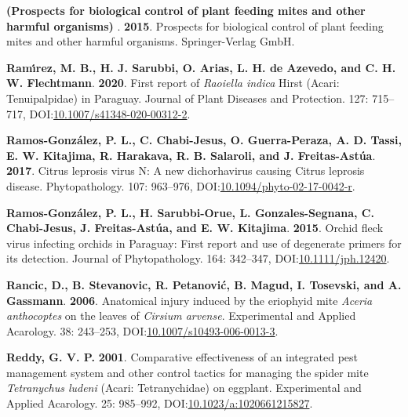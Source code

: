 \documentclass[12pt,final,CPage]{ufthesis}
\newlength{\cslhangindent}
\newenvironment{CSLReferences}[2] %
{%
	\setlength{\parindent}{0pt}
	\ifodd #1 \everypar{\setlength{\hangindent}{\cslhangindent}}\ignorespaces\fi
	\ifnum #2 > 0
	\setlength{\parskip}{#2\baselineskip}
	\fi
}%
{}
\begin{document}
{\begin{CSLReferences}{1}{0}
  \leavevmode{}%
  \textbf{(Prospects for biological control of plant feeding mites and other harmful organisms) }. \textbf{2015}. Prospects for biological control of plant feeding mites and other harmful organisms. Springer-Verlag GmbH.

  \leavevmode{}%
  \textbf{Ramı́rez, M. B., H. J. Sarubbi, O. Arias, L. H. de Azevedo, and C. H. W. Flechtmann}. \textbf{2020}. First report of {\emph{Raoiella indica}} {Hirst} ({Acari}: {Tenuipalpidae}) in {Paraguay}. Journal of Plant Diseases and Protection. 127: 715--717, DOI:\href{https://doi.org/10.1007/s41348-020-00312-2}{10.1007/s41348-020-00312-2}.

  \leavevmode{}%
  \textbf{Ramos-González, P. L., C. Chabi-Jesus, O. Guerra-Peraza, A. D. Tassi, E. W. Kitajima, R. Harakava, R. B. Salaroli, and J. Freitas-Astúa}. \textbf{2017}. {Citrus leprosis virus} {N}: A new dichorhavirus causing {Citrus leprosis} disease. Phytopathology{\textregistered}. 107: 963--976, DOI:\href{https://doi.org/10.1094/phyto-02-17-0042-r}{10.1094/phyto-02-17-0042-r}.

  \leavevmode{}%
  \textbf{Ramos-González, P. L., H. Sarubbi-Orue, L. Gonzales-Segnana, C. Chabi-Jesus, J. Freitas-Astúa, and E. W. Kitajima}. \textbf{2015}. {Orchid fleck virus} infecting orchids in {Paraguay}: First report and use of degenerate primers for its detection. Journal of Phytopathology. 164: 342--347, DOI:\href{https://doi.org/10.1111/jph.12420}{10.1111/jph.12420}.

  \leavevmode{}%
  \textbf{Rancic, D., B. Stevanovic, R. Petanović, B. Magud, I. Tosevski, and A. Gassmann}. \textbf{2006}. Anatomical injury induced by the eriophyid mite {\emph{Aceria anthocoptes}} on the leaves of {\emph{Cirsium arvense}}. Experimental and Applied Acarology. 38: 243--253, DOI:\href{https://doi.org/10.1007/s10493-006-0013-3}{10.1007/s10493-006-0013-3}.

  \leavevmode{}%
  \textbf{Reddy, G. V. P.} \textbf{2001}. Comparative effectiveness of an integrated pest management system and other control tactics for managing the spider mite {\emph{Tetranychus ludeni}} {(Acari: Tetranychidae)} on eggplant. Experimental and Applied Acarology. 25: 985--992, DOI:\href{https://doi.org/10.1023/a:1020661215827}{10.1023/a:1020661215827}.


\end{CSLReferences}}
\end{document}
